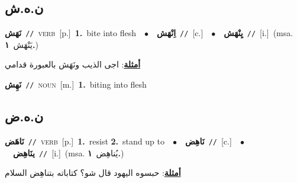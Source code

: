 \documentclass[10pt,a4paper,twoside]{article} %
\begin{document}
\begin{multicols}{2}
\vspace{-3mm}
\subsection*{\color{blue}\foreignlanguage{arabic}{ن.ه.ش}\color{blue}{}} 

{\setlength\topsep{0pt}\textbf{\foreignlanguage{arabic}{نَهَش}}\ {\color{gray}\texttt{//}\color{black}}\ \textsc{verb}\ [p.]\ \textbf{1.}~bite into flesh\ \ $\bullet$\ \ \setlength\topsep{0pt}\textbf{\foreignlanguage{arabic}{اِنْهَش}}\ {\color{gray}\texttt{//}\color{black}}\ [c.]\ \ $\bullet$\ \ \setlength\topsep{0pt}\textbf{\foreignlanguage{arabic}{يِنْهَش}}\ {\color{gray}\texttt{//}\color{black}}\ [i.]\ \color{gray}(msa. \foreignlanguage{arabic}{يَنْهَش}~\foreignlanguage{arabic}{\textbf{١.}})\color{black}\  \begin{flushright}\color{gray}\foreignlanguage{arabic}{\textbf{\underline{\foreignlanguage{arabic}{أمثلة}}}: اجى الذيب ونَهَش بالعبورة قدامي}\end{flushright}\color{black}} \vspace{2mm}

{\setlength\topsep{0pt}\textbf{\foreignlanguage{arabic}{نَهِش}}\ {\color{gray}\texttt{//}\color{black}}\ \textsc{noun}\ [m.]\ \textbf{1.}~biting into flesh\ } \vspace{2mm}

\vspace{-3mm}
\subsection*{\color{blue}\foreignlanguage{arabic}{ن.ه.ض}\color{blue}{}} 

{\setlength\topsep{0pt}\textbf{\foreignlanguage{arabic}{نَاهَض}}\ {\color{gray}\texttt{//}\color{black}}\ \textsc{verb}\ [p.]\ \textbf{1.}~resist  \textbf{2.}~stand up to\ \ $\bullet$\ \ \setlength\topsep{0pt}\textbf{\foreignlanguage{arabic}{نَاهِض}}\ {\color{gray}\texttt{//}\color{black}}\ [c.]\ \ $\bullet$\ \ \setlength\topsep{0pt}\textbf{\foreignlanguage{arabic}{ينَاهِض}}\ {\color{gray}\texttt{//}\color{black}}\ [i.]\ \color{gray}(msa. \foreignlanguage{arabic}{يُناهِض}~\foreignlanguage{arabic}{\textbf{١.}})\color{black}\  \begin{flushright}\color{gray}\foreignlanguage{arabic}{\textbf{\underline{\foreignlanguage{arabic}{أمثلة}}}: حبسوه اليهود قال شو؟ كتاباته بتناهِض السلام}\end{flushright}\color{black}} \vspace{2mm}


\end{multicols}
\end{document}
